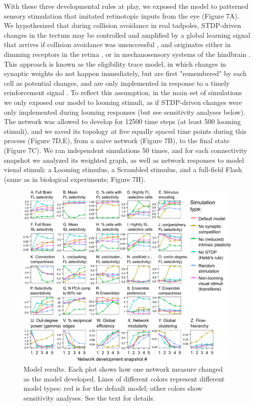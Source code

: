 \documentclass{article}
\begin{document}
With these three developmental rules at play, we exposed the model to patterned sensory stimulation that imitated retinotopic inputs from the eye (Figure 7A). We hypothesized that during collision avoidance in real tadpoles, STDP-driven changes in the tectum may be controlled and amplified by a global learning signal that arrives if collision avoidance was unsuccessful \citep{savin2014stdpreward, aswolinskiy2015stdpreward}, and originates either in dimming receptors in the retina \citep{baranauskas2012}, or in mechanosensory systems of the hindbrain \citep{pratt2009multisens, felch2016, truszkowski2017}. This approach is known as the eligibility trace model, in which changes in synaptic weights do not happen immediately, but are first "remembered" by each cell as potential changes, and are only implemented in response to a timely reinforcement signal \citep{seung2003trace}. To reflect this assumption, in the main set of simulations we only exposed our model to looming stimuli, as if STDP-driven changes were only implemented during looming responses (but see sensitivity analyses below). The network was allowed to develop for 12500 time steps (at least 500 looming stimuli), and we saved its topology at five equally spaced time points during this process (Figure 7D,E), from a naive network (Figure 7B), to the final state (Figure 7C). We ran independent simulations 50 times, and for each connectivity snapshot we analyzed its weighted graph, as well as network responses to model visual stimuli: a Looming stimulus, a Scrambled stimulus, and a full-field Flash (same as in biological experiments; Figure 7H).

\begin{figure}[t!]
\includegraphics[width=\linewidth]{fig8.pdf}
\caption{
Model results. Each plot shows how one network measure changed as the model developed. Lines of different colors represent different model types: red is for the default model; other colors show sensitivity analyses. See the text for details.}
\end{figure}
\end{document}
